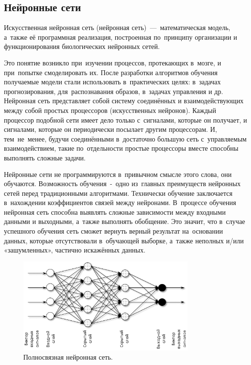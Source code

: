 \subsection{Нейронные сети}\label{subsec:neural_network}

\begin{definition}
  Искусственная нейронная сеть (нейронная сеть)~---~математическая модель, а~также её программная реализация, построенная по~принципу организации и функционирования биологических нейронных сетей.
\end{definition}
Это понятие возникло при~изучении процессов, протекающих в~мозге, и при~попытке смоделировать их. После разработки алгоритмов обучения получаемые модели стали использовать в~практических целях: в~задачах прогнозирования, для~распознавания образов, в~задачах управления и др.
Нейронная сеть представляет собой систему соединённых и взаимодействующих между собой простых процессоров (искусственных нейронов).
Каждый процессор подобной сети имеет дело только с~сигналами, которые он получает, и сигналами, которые он периодически посылает другим процессорам. И, тем~не~менее, будучи соединёнными в~достаточно большую сеть с~управляемым взаимодействием, такие по~отдельности простые процессоры вместе способны выполнять сложные задачи.

Нейронные сети не программируются в~привычном смысле этого слова, они обучаются. Возможность обучения~-~одно из~главных преимуществ нейронных сетей перед традиционными алгоритмами. Технически обучение заключается в~нахождении коэффициентов связей между нейронами. В~процессе обучения нейронная сеть способна выявлять сложные зависимости между входными данными и выходными, а~также выполнять обобщение. Это значит, что в~случае успешного обучения сеть сможет вернуть верный результат на~основании данных, которые отсутствовали в~обучающей выборке, а~также неполных и/или «зашумленных», частично искажённых данных.

\begin{figure}[h]
    \centering
    \includegraphics[width=0.8\textwidth]{nn_vizualisation}
    \caption{Полносвязная нейронная сеть.}
    \label{fig:nn}
\end{figure}

